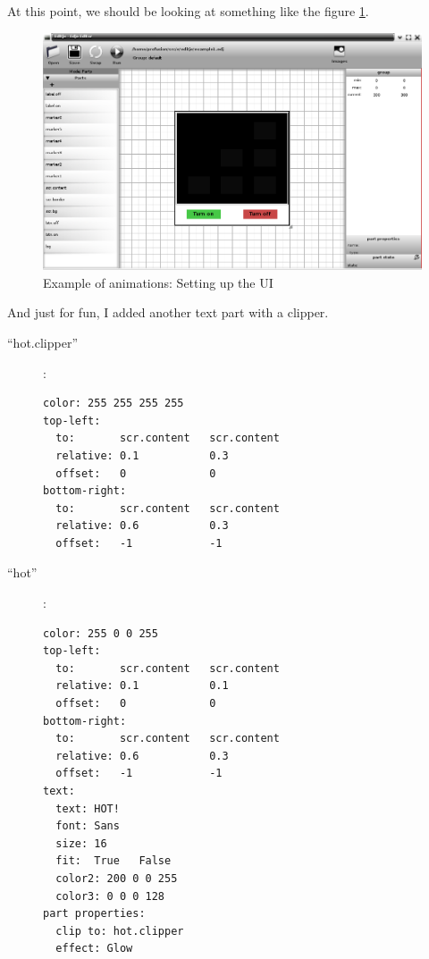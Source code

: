 \documentclass[a4paper]{profusion}
\begin{document}
At this point, we should be looking at something like the figure
\ref{fig:anim1_layout}.

\begin{figure}[h!]
  \centering
  \includegraphics[width=1.0\textwidth]{examples/anim1_layout.png}
  \caption{Example of animations: Setting up the UI}
  \label{fig:anim1_layout}
\end{figure}

And just for fun, I added another text part with a clipper.

\begin{description}
\item[``hot.clipper'']:
\begin{verbatim}
color: 255 255 255 255
top-left:
  to:       scr.content   scr.content
  relative: 0.1           0.3
  offset:   0             0
bottom-right:
  to:       scr.content   scr.content
  relative: 0.6           0.3
  offset:   -1            -1
\end{verbatim}
\item[``hot'']:
\begin{verbatim}
color: 255 0 0 255
top-left:
  to:       scr.content   scr.content
  relative: 0.1           0.1
  offset:   0             0
bottom-right:
  to:       scr.content   scr.content
  relative: 0.6           0.3
  offset:   -1            -1
text:
  text: HOT!
  font: Sans
  size: 16
  fit:  True   False
  color2: 200 0 0 255
  color3: 0 0 0 128
part properties:
  clip to: hot.clipper
  effect: Glow
\end{verbatim}
\end{description}

%
%
%
\end{document}
